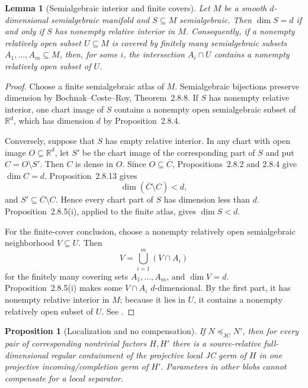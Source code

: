 \documentclass[11pt]{article}
\newtheorem{proposition}[theorem]{Proposition}
\newtheorem{lemma}[theorem]{Lemma}
\theoremstyle{remark}
\newcommand{\R}{\mathbb R}
\newcommand{\JC}{\mathrm{JC}}
\newcommand{\preceqjc}{\preceq_{\!\JC}}
\begin{document}
\begin{lemma}[Semialgebraic interior and finite covers]\label{lem:finite-cover}
Let $M$ be a smooth $d$-dimensional semialgebraic manifold and
$S\subseteq M$ semialgebraic.  Then $\dim S=d$ if and only if $S$ has
nonempty relative interior in $M$.  Consequently, if a nonempty relatively
open subset $U\subseteq M$ is covered by finitely many semialgebraic subsets
$A_1,\ldots,A_m\subseteq M$, then, for some $i$, the intersection $A_i\cap U$
contains a nonempty relatively open subset of $U$.
\end{lemma}

\begin{proof}
Choose a finite semialgebraic atlas of $M$.  Semialgebraic bijections preserve
dimension by Bochnak--Coste--Roy, Theorem~2.8.8.  If $S$ has nonempty relative
interior, one chart image of $S$ contains a nonempty open semialgebraic subset
of $\R^d$, which has dimension $d$ by Proposition~2.8.4.

Conversely, suppose that $S$ has empty relative interior.  In any chart with
open image $O\subseteq\R^d$, let $S'$ be the chart image of the corresponding
part of $S$ and put $C=O\setminus S'$.  Then $C$ is dense in $O$.  Since
$O\subseteq\overline C$, Propositions~2.8.2 and 2.8.4 give $\dim C=d$.
Proposition~2.8.13 gives
\[
  \dim(\overline C\setminus C)<d,
\]
and $S'\subseteq\overline C\setminus C$.  Hence every chart part of $S$ has
dimension less than $d$.  Proposition~2.8.5(i), applied to the finite atlas,
gives $\dim S<d$.

For the finite-cover conclusion, choose a nonempty relatively open
semialgebraic neighborhood $V\subseteq U$.  Then
\[
  V=\bigcup_{i=1}^m(V\cap A_i)
\]
for the finitely many covering sets $A_1,\ldots,A_m$, and $\dim V=d$.
Proposition~2.8.5(i) makes some $V\cap A_i$ $d$-dimensional.  By the first
part, it has nonempty relative interior in $M$; because it lies in $U$, it
contains a nonempty relatively open subset of $U$.
See \cite[Theorem~2.8.8 and Propositions~2.8.2, 2.8.4,
2.8.5(i), and 2.8.13]{BochnakCosteRoy1998}.
\end{proof}

\begin{proposition}[Localization and no compensation]\label{prop:localize}
If $N\preceqjc N'$, then for every pair of corresponding nontrivial factors
$H,H'$ there is a source-relative full-dimensional regular containment of
the projective local JC germ of $H$ in one projective incoming/completion germ
of $H'$.  Parameters in other blobs cannot compensate for a local separator.
\end{proposition}
\end{document}

